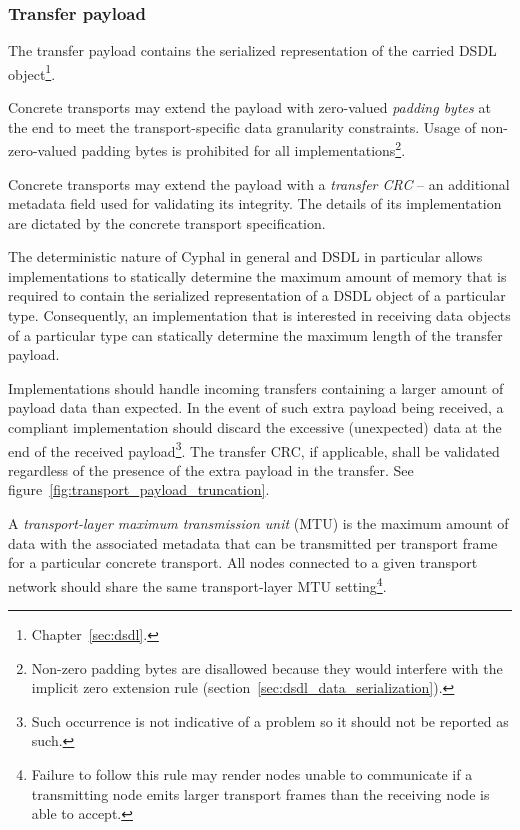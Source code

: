 \subsubsection{Transfer payload}\label{sec:transport_transfer_payload}

The transfer payload contains the serialized representation of the carried
DSDL object\footnote{Chapter~\ref{sec:dsdl}.}.

Concrete transports may extend the payload with zero-valued \emph{padding bytes} at the end
to meet the transport-specific data granularity constraints.
Usage of non-zero-valued padding bytes is prohibited for all implementations\footnote{%
    Non-zero padding bytes are disallowed because they would interfere with the implicit zero extension rule
    (section~\ref{sec:dsdl_data_serialization}).
}.

Concrete transports may extend the payload with a \emph{transfer CRC}
-- an additional metadata field used for validating its integrity.
The details of its implementation are dictated by the concrete transport specification.

The deterministic nature of Cyphal in general and DSDL in particular allows implementations to statically determine
the maximum amount of memory that is required to contain the serialized representation
of a DSDL object of a particular type.
Consequently, an implementation that is interested in receiving data objects of a particular type
can statically determine the maximum length of the transfer payload.

Implementations should handle incoming transfers containing a larger amount of payload data than expected.
In the event of such extra payload being received, a compliant implementation should
discard the excessive (unexpected) data at the end of the received payload\footnote{%
    Such occurrence is not indicative of a problem so it should not be reported as such.
}.
The transfer CRC, if applicable, shall be validated regardless of the presence of the extra payload in the transfer.
See figure~\ref{fig:transport_payload_truncation}.

A \emph{transport-layer maximum transmission unit} (MTU) is the maximum amount of data with the associated metadata
that can be transmitted per transport frame for a particular concrete transport.
All nodes connected to a given transport network should share the same transport-layer MTU setting\footnote{%
    Failure to follow this rule may render nodes unable to communicate if a transmitting node emits larger transport
    frames than the receiving node is able to accept.
}.

